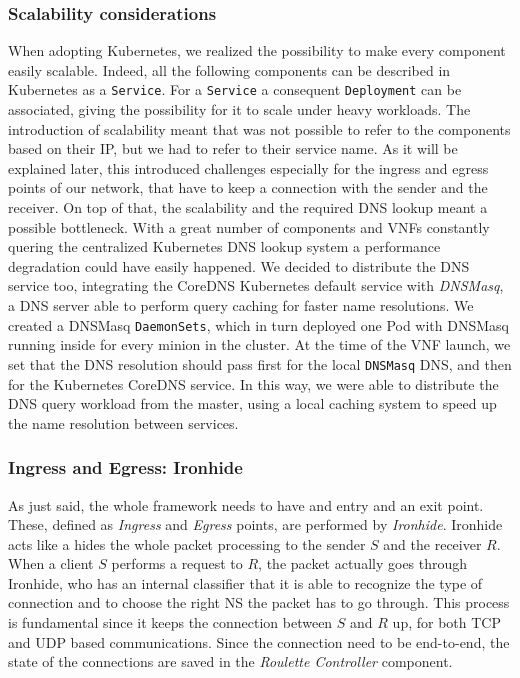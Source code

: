 \subsubsection{Scalability considerations}
When adopting Kubernetes, we realized the possibility to make every component
easily scalable. Indeed, all the following components can be described in
Kubernetes as a \verb!Service!. For a \verb!Service! a consequent
\verb!Deployment! can be associated, giving the possibility for it to scale
under heavy workloads. The introduction of scalability meant that was not
possible to refer to the components based on their IP, but we had to refer to
their service name. As it will be explained later, this introduced challenges
especially for the ingress and egress points of our network, that have to keep a
connection with the sender and the receiver. On top of that, the scalability and
the required DNS lookup meant a possible bottleneck. With a great number of
components and VNFs constantly quering the centralized Kubernetes DNS lookup
system a performance degradation could have easily happened. We decided to
distribute the DNS service too, integrating the CoreDNS Kubernetes default
service with \emph{DNSMasq}, a DNS server able to perform query caching for
faster name resolutions. We created a DNSMasq \verb!DaemonSets!, which in turn
deployed one Pod with DNSMasq running inside for every minion in the cluster. At
the time of the VNF launch, we set that the DNS resolution should pass first for
the local \verb!DNSMasq! DNS, and then for the Kubernetes CoreDNS service. In
this way, we were able to distribute the DNS query workload from the master,
using a local caching system to speed up the name resolution between services.

\subsubsection{Ingress and Egress: Ironhide}
As just said, the whole framework needs to have and entry and an exit point.
These, defined as \emph{Ingress} and \emph{Egress} points, are performed by
\emph{Ironhide}. Ironhide acts like a hides the whole packet processing to the
sender $S$ and the receiver $R$. When a client $S$ performs a request to $R$,
the packet actually goes through Ironhide, who has an internal classifier that
it is able to recognize the type of connection and to choose the right NS the
packet has to go through. This process is fundamental since it keeps the
connection between $S$ and $R$ up, for both TCP and UDP based communications.
Since the connection need to be end-to-end, the state of the connections are
saved in the \emph{Roulette Controller} component.

